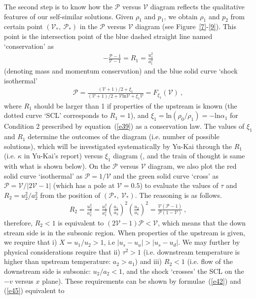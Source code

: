 \documentclass[fleqn,usenatbib]{mnras}
\begin{document}
The second step is to know how the $\mathcal{P}$ versus $\mathcal{V}$ diagram reflects the qualitative features of our self-similar solutions. Given $\rho_{1}$ and $p_{1}$, we obtain $\rho_{1}$ and $p_{2}$ from certain point $(\mathcal{V}_{*},\ \mathcal{P}_{*})$ in the $\mathcal{P}$ versus $\mathcal{V}$ diagram (see Figure~\ref{7}-\ref{9}). This point is the intersection point of the blue dashed straight line named `conservation' as 
\begin{align}
-\frac{\mathcal{P}-1}{\mathcal{V}-1}=R_{1}=\frac{u_{1}^{2}}{a_{1}^{2}}\label{e43}
\end{align}
(denoting mass and momentum conservation) and the blue solid curve `shock isothermal' 
\begin{align}
\mathcal{P}=\frac{(\mathcal{V}+1)/2+\xi_{1}}{(\mathcal{V}+1)/2+\mathcal{V}\mathrm{ln}\mathcal{V}+\xi_{1}\mathcal{V}}=F_{\xi_{1}}(\mathcal{V})\ ,\label{e44}
\end{align}
where $R_{1}$ should be larger than 1 if properties of the upstream is known (the dotted curve `SCL' corresponds to $R_{1}=1$), and $\xi_{1}=\mathrm{ln}(\rho_{0}/\rho_{1})=-\mathrm{ln}\alpha_{1}$ for Condition 2 prescribed by equation~(\ref{e39}) as a conservation law. The values of $\xi_{1}$ and $R_{1}$ determine the outcomes of the diagram (i.e. number of possible solutions), which will be investigated systematically by Yu-Kai through the $R_{1}$ (i.e. $\kappa$ in Yu-Kai's report) versus $\xi_{1}$ diagram (, and the train of thought is same with what is shown below). On the $\mathcal{P}$ versus $\mathcal{V}$ diagram, we also plot the red solid curve `isothermal' as $\mathcal{P}=1/\mathcal{V}$ and the green solid curve `cross' as $\mathcal{P}=\mathcal{V}/|2\mathcal{V}-1|$ (which has a pole at $\mathcal{V}=0.5$) to evaluate the values of $\tau$ and $R_{2}=u_{2}^{2}/a_{2}^{2}$ from the position of $(\mathcal{P}_{*},\ \mathcal{V}_{*})$. The reasoning is as follows.
\begin{align}
R_{2}=\frac{u_{2}^{2}}{a_{2}^{2}}=\frac{u_{1}^{2}}{a_{1}^{2}}\left(\frac{a_{1}}{a_{2}}\right)^{2}\left(\frac{u_{2}}{u_{1}}\right)^{2}=\frac{\mathcal{V}(\mathcal{P}-1)}{\mathcal{P}(1-\mathcal{V})}\ ,\label{e45}
\end{align}
therefore, $R_{2}<1$ is equivalent to $(2\mathcal{V}-1)\mathcal{P}<\mathcal{V}$, which means that the down stream side is in the subsonic region. When properties of the upstream is given, we require that i) $X=u_{1}/u_{2}>1$, i.e $|u_{s}-u_{u}|>|u_{s}-u_{d}|$. We may further by physical considerations require that ii) $\tau^{2}>1$ (i.e. downstream temperature is higher than upstream temperature: $a_{2}>a_{1}$) and iii) $R_{2}< 1$ (i.e. flow of the downstream side is subsonic: $u_{2}/a_{2}<1$, and the shock `crosses' the SCL on the $-v$ versus $x$ plane). These requirements can be shown by formulae~(\ref{e42}) and (\ref{e45}) equivalent to
\end{document}
